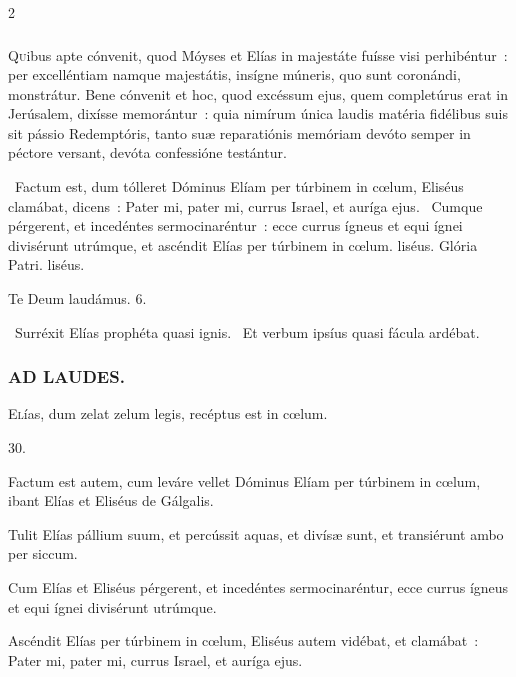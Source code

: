 \documentclass[9pt,twoside]{extarticle}
\begin{document}
\begin{multicols}{2}
{\subsubsection*{\center {}}
\lettrine{Q}uibus apte cónvenit, quod Móyses et Elías in majestáte fuísse visi perhibéntur~: per excelléntiam namque majestátis, insígne múneris, quo sunt coronándi, monstrátur. Bene cónvenit et hoc, quod excéssum ejus, quem completúrus erat in Jerúsalem, dixísse memorántur~: quia nimírum única laudis matéria fidélibus suis sit pássio Redemptóris, tanto suæ reparatiónis memóriam devóto semper in péctore versant, devóta confessióne testántur.

\begin{tightlist}{}
\item {}~Factum est, dum tólleret Dóminus Elíam per túrbinem in cœlum, \textred{*} Eliséus clamábat, dicens~: Pater mi, pater mi, currus Israel, et auríga ejus. ~Cumque pérgerent, et incedéntes sermocinaréntur~: ecce currus ígneus et equi ígnei divisérunt utrúmque, et ascéndit Elías per túrbinem in cœlum. liséus. Glória Patri. liséus.
\item Te Deum laudámus. 6.
\item {}~Surréxit Elías prophéta quasi ignis. ~Et verbum ipsíus quasi fácula ardébat.
\end{tightlist}

\subsubsection*{\center \textsc{AD LAUDES.}}
\begin{center}\end{center}
\lettrine{E}lías, dum zelat zelum legis, recéptus est in cœlum.

\begin{tightlist}
\item {} 30.
\item {} Factum est autem, cum leváre vellet Dóminus Elíam per túrbinem in cœlum, ibant Elías et Eliséus de Gálgalis.
\item {} Tulit Elías pállium suum, et percússit aquas, et divísæ sunt, et transiérunt ambo per siccum.
\item {} Cum Elías et Eliséus pérgerent, et incedéntes sermocinaréntur, ecce currus ígneus et equi ígnei divisérunt utrúmque.
\item {} Ascéndit Elías per túrbinem in cœlum, Eliséus autem vidébat, et clamábat~: Pater mi, pater mi, currus Israel, et auríga ejus.
\end{tightlist}

}
\end{multicols}
\end{document}
